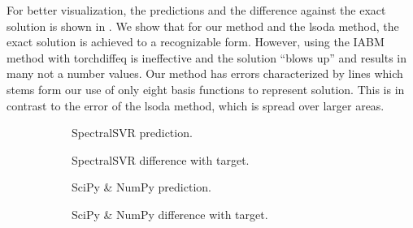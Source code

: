 For better visualization, the predictions and the difference against the exact solution is shown in . We show that for our method and the lsoda method, the exact solution is achieved to a recognizable form. However, using the IABM method with torchdiffeq is ineffective and the solution \enquote{blows up} and results in many not a number values. Our method has errors characterized by lines which stems form our use of only eight basis functions to represent solution. This is in contrast to the error of the lsoda method, which is spread over larger areas.
\begin{figure}[H]
  \centering
  \begin{adjustwidth}{-0.05\linewidth}{-0.05\linewidth}
    \begin{subfigure}{0.49\linewidth}
      \begin{adjustbox}{width=\linewidth}
        
      \end{adjustbox}
      \caption{SpectralSVR prediction.}\label{fig:comp_exact_model_pred_0.1}
    \end{subfigure}
    \begin{subfigure}{0.49\linewidth}
      \begin{adjustbox}{width=\linewidth}
        
      \end{adjustbox}
      \caption{SpectralSVR difference with target.}\label{fig:comp_exact_model_diff_0.1}
    \end{subfigure}
    \begin{subfigure}{0.49\linewidth}
      \begin{adjustbox}{width=\linewidth}
        
      \end{adjustbox}
      \caption{SciPy \& NumPy prediction.}\label{fig:comp_exact_spo_pred_0.1}
    \end{subfigure}
    \begin{subfigure}{0.49\linewidth}
      \begin{adjustbox}{width=\linewidth}
        
      \end{adjustbox}
      \caption{SciPy \& NumPy difference with target.}\label{fig:comp_exact_spo_diff_0.1}
    \end{subfigure}
    \begin{subfigure}{0.49\linewidth}
      \begin{adjustbox}{width=\linewidth}

\end{adjustbox}
\end{subfigure}
\end{adjustwidth}
\end{figure}
